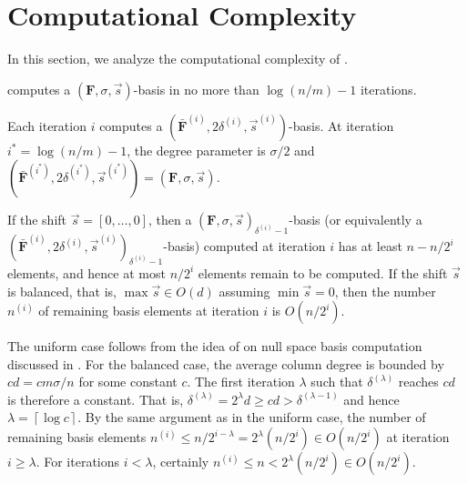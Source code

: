 
\section{Computational Complexity}

\label{sec:complexity}

In this section, we analyze the computational complexity of .
\begin{lem}
 computes a $\left(\mathbf{F},\sigma,\vec{s}\right)$-basis
in no more than $\log\left(n/m\right)-1$ iterations.\end{lem}
\begin{pf}
Each iteration $i$ computes a $(\bar{\mathbf{F}}^{\left(i\right)},2\delta^{\left(i\right)},\vec{s}^{\left(i\right)})$-basis.
At iteration ${i}^{*}=\log(n/m)-1$, the degree parameter is $\sigma/2$
and $(\bar{\mathbf{F}}^{\left({i}^{*}\right)},2\delta^{\left({i}^{*}\right)},\vec{s}^{\left({i}^{*}\right)})=\left(\mathbf{F},\sigma,\vec{s}\right)$.\end{pf}
\begin{lem}
\label{lem:remainingNumberElements}If the shift $\vec{s}=\left[0,\dots,0\right]$,
then a $\left(\mathbf{F},\sigma,\vec{s}\right)_{\delta^{\left(i\right)}-1}$-basis
(or equivalently a $(\bar{\mathbf{F}}^{\left(i\right)},2\delta^{\left(i\right)},\vec{s}^{\left(i\right)})_{\delta^{\left(i\right)}-1}$-basis)
computed at iteration $i$ has at least $n-n/2^{i}$ elements, and
hence at most $n/2^{i}$ elements remain to be computed. If the shift
$\vec{s}$ is balanced, that is, $\max\vec{s}\in O(d)$ assuming $\min\vec{s}=0$,
then the number $n^{\left(i\right)}$ of remaining basis elements
at iteration $i$ is $O(n/2^{i})$.\end{lem}
\begin{pf}
The uniform case follows from the idea of \citet{storjohann-villard:2005}
on null space basis computation discussed in .
For the balanced case, the average column degree is bounded by $cd=cm\sigma/n$
for some constant $c$. The first iteration $\lambda$ such that $\delta^{\left(\lambda\right)}$
reaches $cd$ is therefore a constant. That is, $\delta^{\left(\lambda\right)}=2^{\lambda}d\ge cd>\delta^{\left(\lambda-1\right)}$
and hence $\lambda=\left\lceil \log c\right\rceil $. By the same
argument as in the uniform case, the number of remaining basis elements
$n^{\left(i\right)}\le n/2^{i-\lambda}=2^{\lambda}(n/2^{i})\in O(n/2^{i})$
at iteration $i\ge\lambda$. For iterations $i<\lambda$, certainly
$n^{\left(i\right)}\le n<2^{\lambda}(n/2^{i})\in O(n/2^{i})$.\end{pf}
